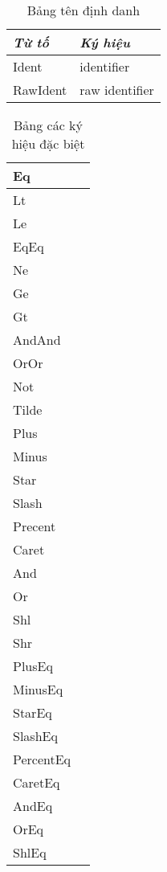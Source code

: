 \begin{longtable}{|p{4cm}|p{4cm}|}
    \caption{Bảng tên định danh} \\
\hline
\textbf{\textit{Từ tố}} & \textbf{\textit{Ký hiệu}} \\
\hline
Ident & identifier \\
\hline
RawIdent & raw identifier \\
\hline
\end{longtable}

\begin{longtable}{|p{4cm}|p{4cm}|}
    \caption{Bảng các ký hiệu đặc biệt} \\
\hline
Eq & \kw{=} \\
\hline
Lt & \kw{<} \\
\hline
Le & \kw{<=} \\
\hline
EqEq & \kw{==} \\
\hline
Ne & \kw{!=} \\
\hline
Ge & \kw{>=} \\
\hline
Gt & \kw{>} \\
\hline
AndAnd & \kw{\&\&} \\
\hline
OrOr & \kw{$|\,|$} \\
\hline
Not & \kw{!} \\
\hline
Tilde & \kw{-} \\
\hline
Plus & \kw{+} \\
\hline
Minus & \kw{-} \\
\hline
Star & \kw{*} \\
\hline
Slash & \kw{/} \\
\hline
Precent & \kw{\%} \\
\hline
Caret & \kw{$\wedge$} \\
\hline
And & \kw{\&} \\
\hline
Or & \kw{|} \\
\hline
Shl & \kw{<}\kw{<} \\
\hline
Shr & \kw{>}\kw{>} \\
\hline
PlusEq & \kw{+=} \\
\hline
MinusEq & \kw{-=} \\
\hline
StarEq & \kw{*=} \\
\hline
SlashEq & \kw{/=} \\
\hline
PercentEq & \kw{\%=} \\
\hline
CaretEq & \kw{$\wedge$=} \\
\hline
AndEq & \kw{\&=} \\
\hline
OrEq & \kw{|=} \\
\hline
ShlEq & \kw{<}\kw{<=} \\

\end{longtable}
